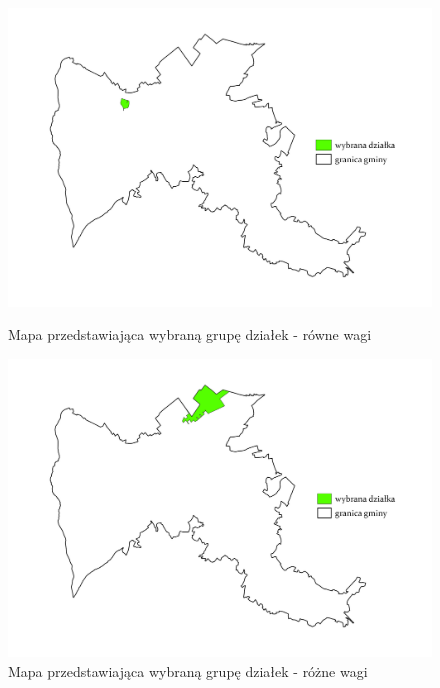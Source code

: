 \documentclass{article}
\begin{document}
\begin{figure}[H]
    \begin{minipage}[t]{0.48\textwidth}
        \centering
        \includegraphics[width=\linewidth]{img/wybrana-dzialka.jpg}
        \caption{Mapa przedstawiająca wybraną grupę działek - równe wagi}
        \label{fig:dzialki-linie-rowne}
    \end{minipage}
    \hfill
    \begin{minipage}[t]{0.48\textwidth}
        \centering
        \includegraphics[width=\linewidth]{img/roznewagi-wybrana-dzialka.jpg}
        \caption{Mapa przedstawiająca wybraną grupę działek - różne wagi}
        \label{fig:dzialki-linie-rowne}
    \end{minipage}
\end{figure}
\newpage
\end{document}
